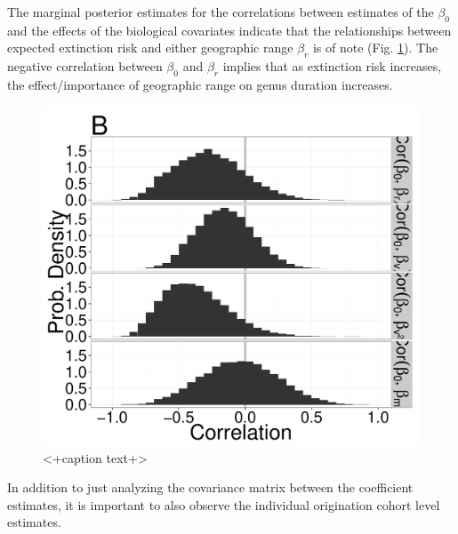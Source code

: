 \documentclass[12pt,letterpaper]{article}
\begin{document}
The marginal posterior estimates for the correlations between estimates of the \(\beta_{0}\) and the effects of the biological covariates indicate that the relationships between expected extinction risk and either geographic range \(\beta_{r}\) is of note (Fig. \ref{fig:corr}). The negative correlation between \(\beta_{0}\) and \(\beta_{r}\) implies that as extinction risk increases, the effect/importance of geographic range on genus duration increases. %
\begin{figure}[ht]
  \centering
  \includegraphics[height = 0.5\textheight,width=\textwidth,keepaspectratio=true]{figure/correlation_marginal}
  \caption{<+caption text+>}
  \label{fig:corr}
\end{figure}

In addition to just analyzing the covariance matrix between the coefficient estimates, it is important to also observe the individual origination cohort level estimates. 
\end{document}
